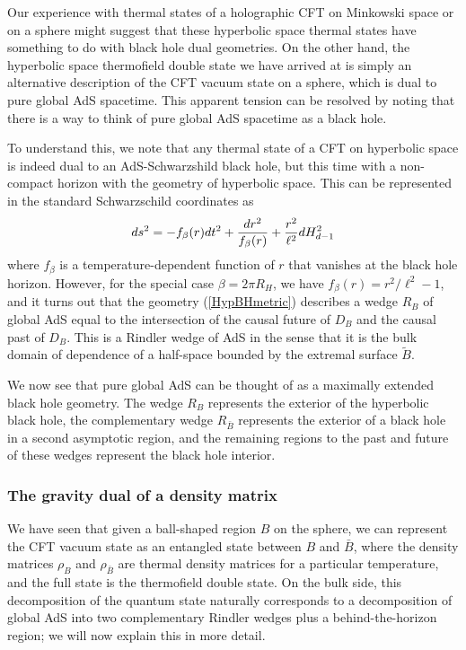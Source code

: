 \documentclass[12pt,epsf]{article}
\newcommand{\be}{\begin{equation}}
\newcommand{\ee}{\end{equation}}
\begin{document}
Our experience with thermal states of a holographic CFT on Minkowski space or on a sphere might suggest that these hyperbolic space thermal states have something to do with black hole dual geometries. On the other hand, the hyperbolic space thermofield double state we have arrived at is simply an alternative description of the CFT vacuum state on a sphere, which is dual to pure global AdS spacetime. This apparent tension can be resolved by noting that there is a way to think of pure global AdS spacetime as a black hole.

To understand this, we note that any thermal state of a CFT on hyperbolic space is indeed dual to an AdS-Schwarzshild black hole, but this time with a non-compact horizon with the geometry of hyperbolic space. This can be represented in the standard Schwarzschild coordinates as
\be
\label{HypBHmetric}
ds^2 = -f_\beta(r) dt^2 + {dr^2 \over f_\beta(r)} + {r^2 \over \ell^2} dH^2_{d-1}
\ee
where $f_\beta$ is a temperature-dependent function of $r$ that vanishes at the black hole horizon.
However, for the special case $\beta = 2 \pi R_H$, we have $f_\beta(r) = r^2/\ell^2 - 1$, and it turns out that the geometry (\ref{HypBHmetric}) describes a wedge $R_B$ of global AdS equal to the intersection of the causal future of $D_B$ and the causal past of $D_B$. This is a Rindler wedge of AdS in the sense that it is the bulk domain of dependence of a half-space bounded by the extremal surface $\tilde{B}$.

We now see that pure global AdS can be thought of as a maximally extended black hole geometry.
The wedge $R_B$ represents the exterior of the hyperbolic black hole, the complementary wedge $R_{\bar{B}}$ represents the exterior of a black hole in a second asymptotic region, and the remaining regions to the past and future of these wedges represent the black hole interior.

\subsubsection*{The gravity dual of a density matrix}

We have seen that given a ball-shaped region $B$ on the sphere, we can represent the CFT vacuum state as an entangled state between $B$ and $\bar{B}$, where the density matrices $\rho_B$ and $\rho_{\bar{B}}$ are thermal density matrices for a particular temperature, and the full state is the thermofield double state. On the bulk side, this decomposition of the quantum state naturally corresponds to a decomposition of global AdS into two complementary Rindler wedges plus a behind-the-horizon region; we will now explain this in more detail.
\end{document}
